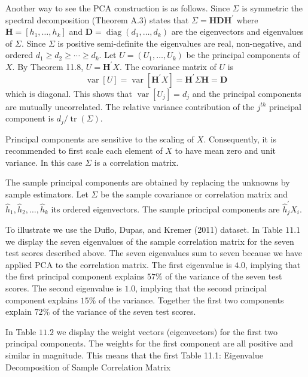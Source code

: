 \documentclass[10pt]{article}
\begin{document}
Another way to see the PCA construction is as follows. Since $\Sigma$ is symmetric the spectral decomposition (Theorem A.3) states that $\Sigma=\boldsymbol{H} \boldsymbol{D} \boldsymbol{H}^{\prime}$ where $\boldsymbol{H}=\left[h_{1}, \ldots, h_{k}\right]$ and $\boldsymbol{D}=\operatorname{diag}\left(d_{1}, \ldots, d_{k}\right)$ are the eigenvectors and eigenvalues of $\Sigma$. Since $\Sigma$ is positive semi-definite the eigenvalues are real, non-negative, and ordered $d_{1} \geq d_{2} \geq \cdots \geq d_{k}$. Let $U=\left(U_{1}, \ldots, U_{k}\right)$ be the principal components of $X$. By Theorem 11.8, $U=\boldsymbol{H}^{\prime} X$. The covariance matrix of $U$ is
$$
\operatorname{var}[U]=\operatorname{var}\left[\boldsymbol{H}^{\prime} X\right]=\boldsymbol{H}^{\prime} \Sigma \boldsymbol{H}=\boldsymbol{D}
$$
which is diagonal. This shows that $\operatorname{var}\left[U_{j}\right]=d_{j}$ and the principal components are mutually uncorrelated. The relative variance contribution of the $j^{t h}$ principal component is $d_{j} / \operatorname{tr}(\Sigma)$.

Principal components are sensitive to the scaling of $X$. Consequently, it is recommended to first scale each element of $X$ to have mean zero and unit variance. In this case $\Sigma$ is a correlation matrix.

The sample principal components are obtained by replacing the unknowns by sample estimators. Let $\widehat{\Sigma}$ be the sample covariance or correlation matrix and $\widehat{h}_{1}, \widehat{h}_{2}, \ldots, \widehat{h}_{k}$ its ordered eigenvectors. The sample principal components are $\widehat{h}_{j}^{\prime} X_{i}$.

To illustrate we use the Duflo, Dupas, and Kremer (2011) dataset. In Table $11.1$ we display the seven eigenvalues of the sample correlation matrix for the seven test scores described above. The seven eigenvalues sum to seven because we have applied PCA to the correlation matrix. The first eigenvalue is $4.0$, implying that the first principal component explains $57 \%$ of the variance of the seven test scores. The second eigenvalue is $1.0$, implying that the second principal component explains $15 \%$ of the variance. Together the first two components explain $72 \%$ of the variance of the seven test scores.

In Table $11.2$ we display the weight vectors (eigenvectors) for the first two principal components. The weights for the first component are all positive and similar in magnitude. This means that the first Table 11.1: Eigenvalue Decomposition of Sample Correlation Matrix
\end{document}
